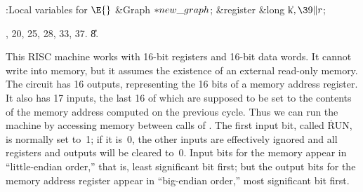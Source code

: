 \B{}:Local variables for \X${}\E{}$\6
\&{Graph} ${}{*}\\{new\_graph}{}$;\6
\&{register} \&{long} \|k${},\39\|r{}$;\par
{}, 20, 25, 28, 33, 37.
\U8.\fi

This RISC machine works with 16-bit registers and 16-bit data words.
It cannot write into memory, but it assumes the existence of an
external read-only memory. The circuit has 16 outputs, representing
the 16 bits of a memory address register. It also has 17 inputs, the
last 16 of which are supposed to be set to the contents of the memory
address computed on the previous cycle. Thus we can run the machine
by accessing memory between calls of .  The first input
bit, called \.{RUN}, is normally set to~1; if it is~0, the other
inputs are effectively ignored and all registers and outputs will be
cleared to~0. Input bits for the memory appear in ``little-endian
order,'' that is, least significant bit first; but the output bits for
the memory address register appear in ``big-endian order,'' most
significant bit first.

